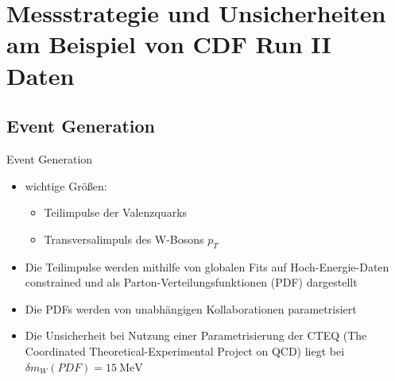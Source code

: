\documentclass[aspectratio=1610, 9pt]{beamer}
\begin{document}
\section{Messstrategie und Unsicherheiten am Beispiel von CDF Run II Daten}

\subsection{Event Generation}

\begin{frame}{Event Generation}
  \begin{itemize}
    \item wichtige Größen:
    \begin{itemize}
      \item[\rightarrow] Teilimpulse der Valenzquarks
      \item[\rightarrow] Transversalimpuls des W-Bosons $p_T$
    \end{itemize}
    \item Die Teilimpulse werden mithilfe von globalen Fits auf Hoch-Energie-Daten constrained und als Parton-Verteilungsfunktionen (PDF) dargestellt
    \item Die PDFs werden von unabhängigen Kollaborationen parametrisiert
    \item Die Unsicherheit bei Nutzung einer Parametrisierung der CTEQ (The Coordinated Theoretical-Experimental Project on QCD) liegt bei $\delta m_W(PDF) = \SI{15}{\MeV}$
  \end{itemize}




\end{frame}
\end{document}
